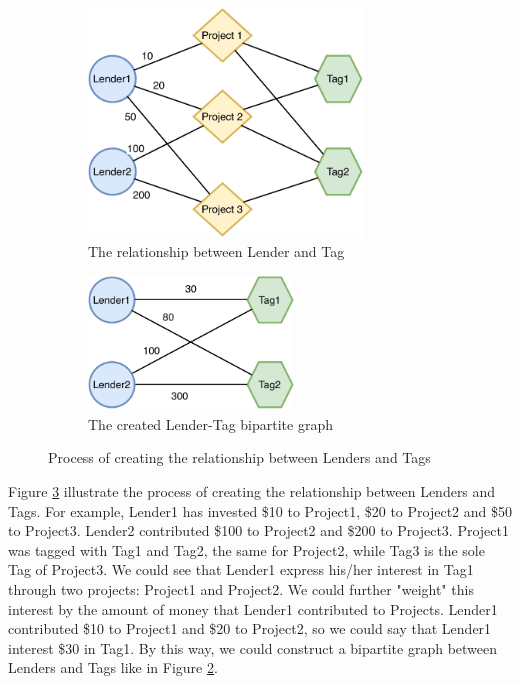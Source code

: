 \begin{figure}[H]
	\centering
	\begin{subfigure}[b]{0.4\textwidth}
		\centering
		\includegraphics[width=0.8\textwidth]{images/schema_lender_tag.pdf}
		\caption{The relationship between Lender and Tag}
		\label{fig:schema_lender_tag}
	\end{subfigure}
	\hspace{5mm}
	\begin{subfigure}[b]{0.4\textwidth}
		\centering
		\includegraphics[width=0.6\textwidth]{images/create_lender_tag.pdf}
		\caption{The created Lender-Tag bipartite graph}
		\label{fig:create_lender_tag2}
	\end{subfigure}
	\caption{Process of creating the relationship between Lenders and Tags}
	\label{fig:create_lender_tag}
\end{figure}


Figure \ref{fig:create_lender_tag} illustrate the process of creating the relationship between Lenders and Tags.
For example, Lender1 has invested \$10 to Project1, \$20 to Project2 and \$50 to Project3.
Lender2 contributed \$100 to Project2 and \$200 to Project3.
Project1 was tagged with Tag1 and Tag2, the same for Project2, while Tag3 is the sole Tag of Project3.
We could see that Lender1 express his/her interest in Tag1 through two projects: Project1 and Project2.
We could further "weight" this interest by the amount of money that Lender1 contributed to Projects.
Lender1 contributed \$10 to Project1 and \$20 to Project2,
so we could say that Lender1 interest \$30 in Tag1.
By this way, we could construct a bipartite graph between Lenders and Tags like in Figure \ref{fig:create_lender_tag2}.

